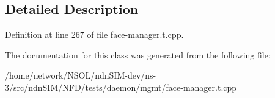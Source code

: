 \subsection{Detailed Description}


Definition at line 267 of file face-\/manager.\+t.\+cpp.



The documentation for this class was generated from the following file\+:\begin{DoxyCompactItemize}
\item 
/home/network/\+N\+S\+O\+L/ndn\+S\+I\+M-\/dev/ns-\/3/src/ndn\+S\+I\+M/\+N\+F\+D/tests/daemon/mgmt/face-\/manager.\+t.\+cpp\end{DoxyCompactItemize}
